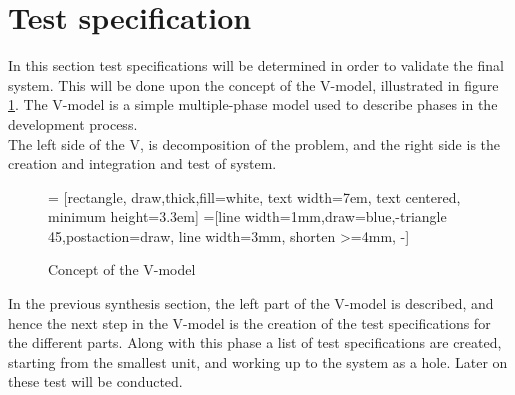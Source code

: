 \section{Test specification}\label{sec:testspec}
In this section test specifications will be determined in order to validate the final system. This will be done upon the concept of the V-model\cite{vmodel}, illustrated in figure \ref{fig:vmodel}.         
The V-model is a simple multiple-phase model used to describe phases in the development process. \\
The left side of the V, is decomposition of the problem, and the right side is the creation and integration and test of system.
\begin{figure}[h]
\centering
{} = [rectangle, draw,thick,fill=white, 
    text width=7em, text centered, minimum height=3.3em]
=[line width=1mm,draw=blue,-triangle 45,postaction={draw, line width=3mm, shorten >=4mm, -}]
\caption{Concept of the V-model}
\label{fig:vmodel}
\end{figure}
In the previous synthesis section, the left part of the V-model is described, and hence the next step in the V-model is the creation of the test specifications for the different parts. Along with this phase a list of test specifications are created, starting from the smallest unit, and working up to the system as a hole. Later on these test will be conducted.\\
